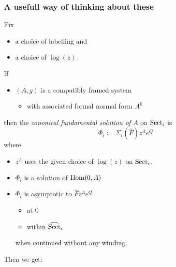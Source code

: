 \subsubsection{A usefull way of thinking about these}
Fix
\begin{itemize}
  \item a choice of labelling and
  \item a choice of $\log(z)$.
\end{itemize}
\begin{defn}
  If
  \begin{itemize}
    \item $(A,g)$ is a compatibly framed system
      \begin{itemize}
        \item with associated formal normal form $A^0$
      \end{itemize}
  \end{itemize}
  then the \emph{cononical fundamental solution of $A$} on $\operatorname{Sect}_i$ is
  \[
    \Phi_i:=\Sigma_i(\hat F)z^\Lambda e^Q
  \]
  where
  \begin{itemize}
    \item $z^\Lambda$ uses the given choice of $\log(z)$ on $\operatorname{Sect}_i$.
  \end{itemize}
  \begin{rem}[???]
    \begin{itemize}
      \item $\Phi_i$ is a solution of $\operatorname{Hom}(0,A)$
      \item $\Phi_i$ is asymptotic to $\hat Fz^\Lambda e^Q$
        \begin{itemize}
          \item at $0$
          \item within $\widehat {\operatorname{Sect}}_i$
        \end{itemize}
        when continued without any winding.
    \end{itemize}
  \end{rem}
\end{defn}
Then we get:
